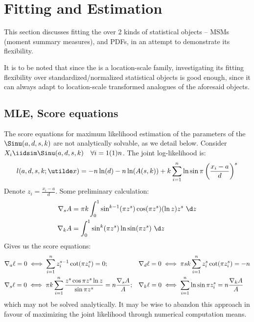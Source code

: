 \newcommand{\Bin}{\text{Bin}}
\newcommand{\Poi}{\text{Poi}}
\newcommand{\Geo}{\text{Geo}}
\newcommand{\NB}{\text{NB}}
\newcommand{\Hyp}{\text{Hyp}}


\section{Fitting and Estimation}
This section discusses fitting the \sindist{} over 2 kinds of statistical objects -- MSMs (moment summary measures), and PDFs, in an attempt to demonstrate its flexibility.

It is to be noted that since the \sindist{} is a location-scale family, investigating its fitting flexibility over standardized/normalized statistical objects is good enough, since it can always adapt to location-scale transformed analogues of the aforesaid objects.

\subsection{MLE, Score equations}
The score equations for maximum likelihood estimation of the parameters of the \sindist{} $\Sinu(a,d,s,k)$ are not analytically solvable, as we detail below. Consider $X_i \iidsim \Sinu(a,d,s,k) \quad \forall i=1(1)n$. The joint log-likelihood is:
\begin{equation*}
    l(a,d,s,k; \utilde x)
    = -n\ln(d)-n\ln(A(s,k)) + k\sum_{i=1}^n \ln \sin \pi\left( x_i-a \over d \right)^s
\end{equation*}
Denote $z_i = \frac{x_i -a}{d}$. Some preliminary calculation:
\begin{align*}
    \nabla_s A &= \pi k \int_0^1 \sin^{k-1}(\pi z^s) \cos(\pi z^s) (\ln z) z^s \ \d z\\
    \nabla_k A &= \int_0^1 \sin^k(\pi z^s) \ln \sin(\pi z^s) \ \d z
\end{align*}
Gives us the score equations:
\begin{align*}
    &\nabla_a \ell = 0 \iff \sum_{i=1}^n z_i^{s-1} \cot(\pi z_i^s) = 0;  && \nabla_d \ell = 0 \iff \pi sk \sum_{i=1}^n z_i^s \cot(\pi z_i^s) = -n \\
    &\nabla_s \ell = 0 \iff  \pi k \sum_{i=1}^n {z^s \cos \pi z^s \ln z  \over \sin \pi z^s} = n {\nabla_s A \over A};  &&  \nabla_k \ell = 0 \iff \sum_{i=1}^n \ln \sin \pi z_i^s = n{\nabla_k A \over A}
\end{align*}
which may not be solved analytically. It may be wise to abandon this approach in favour of maximizing the joint likelihood through numerical computation means.

